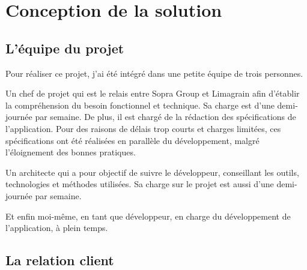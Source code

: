 \cleardoublepage

\chapter{Conception de la solution}


\section{L'équipe du projet}

Pour réaliser ce projet, j'ai été intégré dans une petite équipe de trois personnes.

Un chef de projet qui est le relais entre Sopra Group et Limagrain afin d'établir la compréhension du besoin fonctionnel et technique.
Sa charge est d'une demi-journée par semaine.
De plus, il est chargé de la rédaction des spécifications de l'application.
Pour des raisons de délais trop courts et charges limitées, ces spécifications ont été réalisées en parallèle du développement, malgré l'éloignement des bonnes pratiques.

Un architecte qui a pour objectif de suivre le développeur, conseillant les outils, technologies et méthodes utilisées.
Sa charge sur le projet est aussi d'une demi-journée par semaine.

Et enfin moi-même, en tant que développeur, en charge du développement de l'application, à plein temps.


\section{La relation client}


